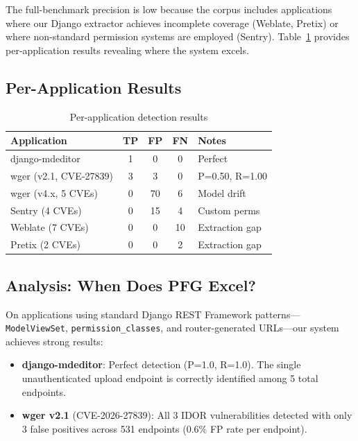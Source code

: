 \documentclass[conference]{IEEEtran}
\begin{document}
The full-benchmark precision is low because the corpus includes applications where our Django extractor achieves incomplete coverage (Weblate, Pretix) or where non-standard permission systems are employed (Sentry). Table~\ref{tab:perapp} provides per-application results revealing where the system excels.

\subsection{Per-Application Results}

\begin{table}[h]
\centering
\caption{Per-application detection results}
\label{tab:perapp}
\begin{tabular}{lcccl}
\toprule
\textbf{Application} & \textbf{TP} & \textbf{FP} & \textbf{FN} & \textbf{Notes} \\
\midrule
django-mdeditor & 1 & 0 & 0 & Perfect \\
wger (v2.1, CVE-27839) & 3 & 3 & 0 & P=0.50, R=1.00 \\
wger (v4.x, 5 CVEs) & 0 & 70 & 6 & Model drift \\
Sentry (4 CVEs) & 0 & 15 & 4 & Custom perms \\
Weblate (7 CVEs) & 0 & 0 & 10 & Extraction gap \\
Pretix (2 CVEs) & 0 & 0 & 2 & Extraction gap \\
\bottomrule
\end{tabular}
\end{table}

\subsection{Analysis: When Does PFG Excel?}

On applications using standard Django REST Framework patterns---\texttt{ModelViewSet}, \texttt{permission\_classes}, and router-generated URLs---our system achieves strong results:

\begin{itemize}
    \item \textbf{django-mdeditor}: Perfect detection (P=1.0, R=1.0). The single unauthenticated upload endpoint is correctly identified among 5 total endpoints.
    \item \textbf{wger v2.1} (CVE-2026-27839): All 3 IDOR vulnerabilities detected with only 3 false positives across 531 endpoints (0.6\% FP rate per endpoint).
\end{itemize}
\end{document}
